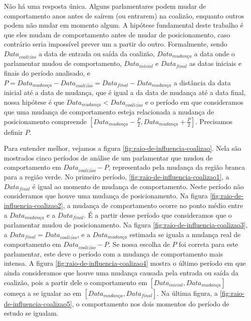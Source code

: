 \documentclass[a4paper,titlepage]{ppgi}\usepackage[]{graphicx}\usepackage[]{color}
\begin{document}
Não há uma resposta única. Alguns parlamentares podem mudar de comportamento
anos antes de saírem (ou entrarem) na coalizão, enquanto outros podem não mudar
em momento algum. A hipótese fundamental deste trabalho é que eles mudam de
comportamento antes de mudar de posicionamento, caso contrário seria impossível
prever um a partir do outro. Formalmente, sendo $Data_{coaliz\tilde{a}o}$ a
data de entrada ou saída da coalizão, $Data_{mudan\textit{\c{c}}a}$ a data onde
o parlamentar mudou de comportamento, $Data_{inicial}$ e $Data_{final}$ as datas
iniciais e finais do período analisado, e $P = Data_{mudan\textit{\c{c}}a} -
Data_{coaliz\tilde{a}o} = Data_{final} - Data_{mudan\textit{\c{c}}a}$ a
distância da data inicial até a data de mudança, que é igual a da data de
mudança até a data final, nossa hipótese é que $Data_{mudan\textit{\c{c}}a} <
Data_{coaliz\tilde{a}o}$ e o período em que consideramos que uma mudança de
comportamento esteja relacionada a mudança de posicionamento compreende
$\left[Data_{mudan\textit{\c{c}}a} - \frac{P}{2}, Data_{mudan\textit{\c{c}}a} +
\frac{P}{2}\right]$. Precisamos definir $P$.

Para entender melhor, vejamos a figura \ref{fig:raio-de-influencia-coalizao}.
Nela são mostrados cinco períodos de análise de um parlamentar que mudou de
comportamento em $Data_{coaliz\tilde{a}o} - P$, representado pela mudança da
região branca para a região verde. No primeiro período,
\ref{fig:raio-de-influencia-coalizao1}, a $Data_{final}$ é igual ao momento de
mudança de comportamento. Neste período não consideramos que houve uma mudança
de posicionamento. Na figura \ref{fig:raio-de-influencia-coalizao2}, a mudança
de comportamento ocorre no ponto médio entre a $Data_{mudan\textit{\c{c}}a}$ e
a $Data_{final}$.  É a partir desse período que consideramos que o parlamentar
mudou de posicionamento. Na figura \ref{fig:raio-de-influencia-coalizao3}, a
$Data_{final} = Data_{coaliz\tilde{a}o}$, e a $Data_{mudan\textit{\c{c}}a}$
estimada se iguala a mudança real de comportamento em $Data_{coaliz\tilde{a}o}
- P$. Se nossa escolha de $P$ foi correta para este parlamentar, este deve o
período com a mudança de comportamento mais intensa. A figura
\ref{fig:raio-de-influencia-coalizao4} mostra o último período em que ainda
consideramos que houve uma mudança causada pela entrada ou saída da coalizão,
pois a partir dele o comportamento em $\left[Data_{inicial},
Data_{mudan\textit{\c{c}}a}\right]$ começa a se igualar ao em
$\left[Data_{mudan\textit{\c{c}}a}, Data_{final}\right]$. Na última figura, a
\ref{fig:raio-de-influencia-coalizao5}, o comportamento nos dois momentos do
período de estudo se igualam.
\end{document}
